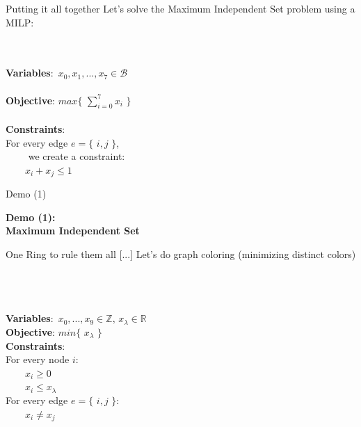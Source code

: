 \documentclass[10pt]{beamer}
\newcommand{\primaryColorB}[1]{\textcolor{mpigreen}{\textbf{#1}}}
\newcommand{\curlO}{\{\,\,}
\newcommand{\curlC}{\,\,\}}
\begin{document}
\begin{frame}{Putting it all together}
Let's solve the Maximum Independent Set problem using a MILP:\\


\begin{figure}
  \scalebox{0.75}{\maxIndependentSet}
\end{figure}
\,\\\,\\
\primaryColorB{Variables}:\, $x_0, x_1, ..., x_7 \in \mathcal{B}$\\\,\\
\primaryColorB{Objective}: $max \curlO\sum\limits_{i=0}^{7} x_i\curlC$\\\,\\
\primaryColorB{Constraints}:\\
For every edge $e=\curlO i,j\curlC$, \\$\qquad$ we create a constraint:\\
	$\qquad x_i + x_j \leq 1$
\end{frame}


\begin{frame}{Demo (1)}

\begin{center}
	\Huge \primaryColorB{Demo (1):\\ Maximum Independent Set}
\end{center}
\end{frame}

\begin{frame}{One Ring to rule them all [...]}
Let's do graph coloring (minimizing distinct colors)

\vspace{-0.9cm}
\begin{figure}
  \scalebox{0.6}{\chromaticNumber}
\end{figure}
\,\\\,\\\,\\
\primaryColorB{Variables}:\, $x_0, ..., x_9 \in \mathbb{Z},\, x_\lambda \in \mathbb{R}$\\
\primaryColorB{Objective}: $min \curlO x_\lambda\curlC$\\
\primaryColorB{Constraints}:\\
For every node $i$:\\
$\qquad x_i \geq 0$\\
$\qquad x_i \leq x_\lambda$\\
For every edge $e=\curlO i,j\curlC$:\\
	$\qquad x_i \neq x_j$\\
\end{frame}
\end{document}

